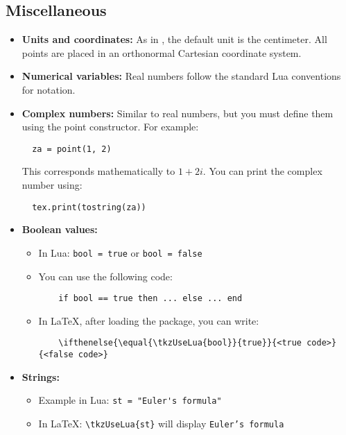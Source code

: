 \subsection{Miscellaneous} %
\label{sub:miscellanous}
\begin{itemize}
  \item \textbf{Units and coordinates:} As in , the default unit is the centimeter. All points are placed in an orthonormal Cartesian coordinate system.

  \item \textbf{Numerical variables:} Real numbers follow the standard Lua conventions for notation.

  \item \textbf{Complex numbers:} Similar to real numbers, but you must define them using the point constructor. For example:
  \begin{verbatim}
  za = point(1, 2)
  \end{verbatim}
  This corresponds mathematically to \(1 + 2i\). You can print the complex number using:
  \begin{verbatim}
  tex.print(tostring(za))
  \end{verbatim}

  \item \textbf{Boolean values:}
  \begin{itemize}
    \item In Lua: \verb|bool = true| or \verb|bool = false|
    \item You can use the following  code:
    \begin{verbatim}
    if bool == true then ... else ... end
    \end{verbatim}
    \item In LaTeX, after loading the  package, you can write:
    \begin{verbatim}
    \ifthenelse{\equal{\tkzUseLua{bool}}{true}}{<true code>}{<false code>}
    \end{verbatim}
  \end{itemize}

  \item \textbf{Strings:}
  \begin{itemize}
    \item Example in Lua: \verb|st = "Euler's formula"|
    \item In LaTeX: \verb|\tkzUseLua{st}| will display \texttt{Euler's formula}
  \end{itemize}
\end{itemize}

\endinput